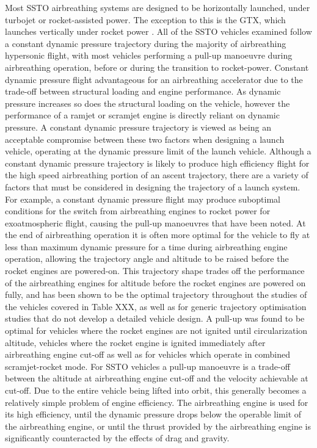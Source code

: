 Most SSTO airbreathing systems are designed to be horizontally launched, under turbojet or rocket-assisted power. The exception to this is the GTX, which launches vertically under rocket power\cite{Roche2000,Trefny1999} . 
All of the SSTO vehicles examined follow a constant dynamic pressure trajectory during the majority of airbreathing hypersonic flight, with most vehicles performing a pull-up manoeuvre during airbreathing operation, before or during the transition to rocket-power. 
Constant dynamic pressure flight advantageous for an airbreathing accelerator due to the trade-off between structural loading and engine performance\cite{Olds1998}. As dynamic pressure increases so does the structural loading on the vehicle, however the performance of a ramjet or scramjet engine is directly reliant on dynamic pressure\cite{Olds1998}. A constant dynamic pressure trajectory is viewed as being an acceptable compromise between these two factors when designing a launch vehicle, operating at the dynamic pressure limit of the launch vehicle. 
Although a constant dynamic pressure trajectory is likely to produce high efficiency flight for the high speed airbreathing portion of an ascent trajectory, there are a variety of factors that must be considered in designing the trajectory of a launch system. 
For example, a constant dynamic pressure flight may produce suboptimal conditions for the switch from airbreathing engines to rocket power for exoatmospheric flight, causing the pull-up manoeuvres that have been noted. 
At the end of airbreathing operation it is often more optimal for the vehicle to fly at less than maximum dynamic pressure for a time during airbreathing engine operation, allowing the trajectory angle and altitude to be raised before the rocket engines are powered-on. 
This trajectory shape trades off the performance of the airbreathing engines for altitude before the rocket engines are powered on fully, and has been shown to be the optimal trajectory throughout the studies of the vehicles covered in Table XXX\cite{Powell1991,Trefny1999,Roche2000,Pescetelli2012,Young2006,Bradford2000}, as well as for generic trajectory optimisation studies that do not develop a detailed vehicle design\cite{Pescetelli2012,Mooij,Lu1993}.
A pull-up was found to be optimal for vehicles where the rocket engines are not ignited until circularization altitude\cite{Powell1991,Lu1993}, vehicles where the rocket engine is ignited immediately after airbreathing engine cut-off\cite{Trefny1999,Roche2000,Pescetelli2012} as well as for vehicles which operate in combined scramjet-rocket mode\cite{Young2006,Bradford2000}.
For SSTO vehicles a pull-up manoeuvre is a trade-off between the altitude at airbreathing engine cut-off and the velocity achievable at cut-off. Due to the entire vehicle being lifted into orbit, this generally becomes a relatively simple problem of engine efficiency. The airbreathing engine is used for its high efficiency, until the dynamic pressure drops below the operable limit of the airbreathing engine, or until the thrust provided by the airbreathing engine is significantly counteracted by the effects of drag and gravity. 

